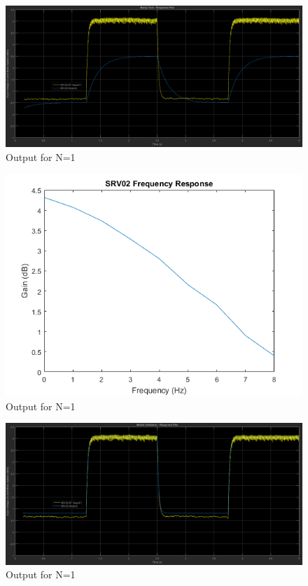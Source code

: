 \begin{figure}[htb]
   \centering
   \includegraphics[scale=0.35]{figures/Bump.png}
   \caption{Output for N=1}
  \label{fig:bump}
\end{figure}
\begin{figure}[htb]
   \centering
   \includegraphics[scale=0.6]{figures/freqResponse.png}
   \caption{Output for N=1}
  \label{fig:bump}
\end{figure}
\begin{figure}[htb]
   \centering
   \includegraphics[scale=0.35]{figures/model.png}
   \caption{Output for N=1}
  \label{fig:bump}
\end{figure}
